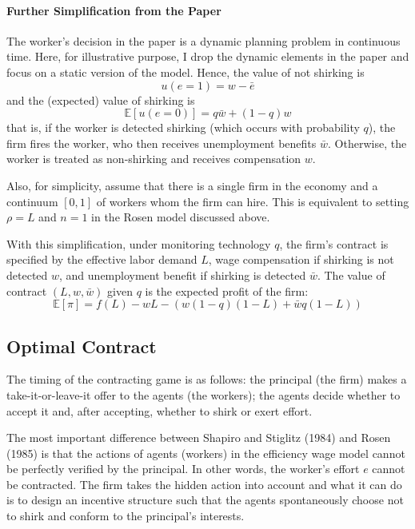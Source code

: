 \documentclass[12pt]{article}
\begin{document}
\paragraph{Further Simplification from the Paper \\ [6pt]}
The worker's decision in the paper is a dynamic planning problem in continuous time. Here, for illustrative purpose, I drop the dynamic elements in the paper and focus on a static version of the model. Hence, the value of not shirking is 
\begin{equation}
	u(e = 1) = w - \bar{e}
\end{equation}
and the (expected) value of shirking is
\begin{equation}
	\mathbb{E}[u(e = 0)] = q \bar{w} + (1-q) w
\end{equation}
	 that is, if the worker is detected shirking (which occurs with probability $q$), the firm fires the worker, who then receives unemployment benefits $\bar{w}$. Otherwise, the worker is treated as non-shirking and receives compensation $w$.  

Also, for simplicity, assume that there is a single firm in the economy and a continuum $[0,1]$ of workers whom the firm can hire. This is equivalent to setting $\rho = L$ and $n = 1$ in the Rosen model discussed above.

With this simplification, under monitoring technology $q$, the firm's contract is specified by the effective labor demand $L$, wage compensation if shirking is not detected $w$, and unemployment benefit if shirking is detected $\bar{w}$. The value of contract $(L, w, \bar{w})$ given $q$ is the expected profit of the firm:
\begin{equation} \label{eq:pi}
	\mathbb{E}[\pi] = f(L) - w L - \left(w (1-q) (1-L) + \bar{w} q (1-L)\right)
\end{equation}

\subsection{Optimal Contract}

The timing of the contracting game is as follows: the principal (the firm) makes a take-it-or-leave-it offer to the agents (the workers); the agents decide whether to accept it and, after accepting, whether to shirk or exert effort. 

The most important difference between Shapiro and Stiglitz (1984) and Rosen (1985) is that the actions of agents (workers) in the efficiency wage model cannot be perfectly verified by the principal. In other words, the worker's effort $e$ cannot be contracted. The firm takes the hidden action into account and what it can do is to design an incentive structure such that the agents spontaneously choose not to shirk and conform to the principal's interests. 
\end{document}
